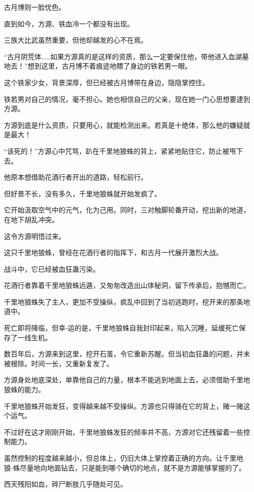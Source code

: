 \begin{this_body}
古月博则一脸忧色。

直到如今，方源、铁血冷一个都没有出现。

三族大比武虽然重要，但他却越发的心不在焉。

“古月阴荒体……如果方源真的是这样的资质，那么一定要保住他，带他进入血湖墓地去！”想到这里，古月博不着痕迹地瞟了身边的铁若男一眼。

这个铁家少女，背景深厚，但已经被古月博带在身边，隐隐掌控住。

铁若男对自己的情况，毫不担心。她也相信自己的父亲，现在她一门心思想要逮到方源。

方源到底是什么资质，只要用心，就能检测出来。若真是十绝体，那么他的嫌疑就是最大！

“该死的！”方源心中咒骂，趴在千里地狼蛛的背上，紧紧地贴住它，防止被甩下去。

他原本想借助花酒行者开出的道路，轻松前行。

但好景不长，没有多久，千里地狼蛛就开始发疯了。

它开始汲取空气中的元气，化为己用。同时，三对触脚轮番开动，挖出新的地道，在地下胡乱冲突。

这令方源明悟过来。

这只千里地狼蛛，曾经在花酒行者的指挥下，和古月一代展开激烈大战。

战斗中，它已经被血狂蛊污染。

花酒行者靠着千里地狼蛛远遁，又匆匆改造出山体秘洞，留下传承后，抱憾而亡。

千里地狼蛛失了主人，更加不受操纵，疯乱中回到了当初逃跑时，挖开来的那条地道中。

死亡即将降临，但幸-运的是，千里地狼蛛自我封印起来，陷入沉睡，延缓死亡保存了一线生机。

数百年后，方源来到这里，挖开石茧，令它重新苏醒。但当初血狂蛊的问题，并未被根除。时间一长，又重新复发了。

方源身处地底深处，单靠他自己的力量，根本不能逃到地面上去，必须借助千里地狼蛛的能力。

千里地狼蛛开始发狂，变得越来越不受操纵。方源也只得骑在它的背上，赌一赌这个运气。

不过好在这才刚刚开始，千里地狼蛛发狂的频率并不高，方源对它还残留着一些控制能力。

虽然控制的程度越来越小，但总体上，仍旧大体上掌控着正确的方向。让千里地狼-蛛尽量地向地面钻去，只是能到哪个确切的地点，就不是方源能够掌握的了。

西天残阳如血，碎尸断肢几乎随处可见。


\end{this_body}
